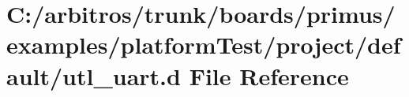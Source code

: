 \hypertarget{boards_2primus_2examples_2platform_test_2project_2default_2utl__uart_8d}{\section{C\-:/arbitros/trunk/boards/primus/examples/platform\-Test/project/default/utl\-\_\-uart.d File Reference}
\label{boards_2primus_2examples_2platform_test_2project_2default_2utl__uart_8d}
}
